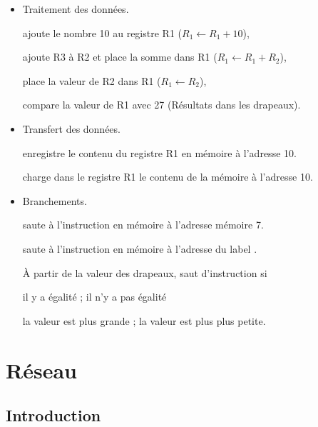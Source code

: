 \begin{itemize}
	\item Traitement des données.
	
	 ajoute le nombre 10 au registre R1 ($R_1 \leftarrow R_1+10$),
	
	 ajoute R3 à R2 et place la somme dans R1 ($R_1 \leftarrow R_1+R_2$),
	
	 place la valeur de R2 dans R1  ($R_1 \leftarrow R_2$),
	
	 compare la valeur de R1 avec 27 (Résultats dans les drapeaux).
	
	\item Transfert des données.
   	
	 enregistre le contenu du registre R1 en mémoire à l'adresse 10.
   	
	 charge dans le registre R1 le contenu de la mémoire à l'adresse 10.
	
	\item Branchements.
	
	 saute à l'instruction en mémoire à l'adresse mémoire 7.
	
	 saute à l'instruction en mémoire à l'adresse du label .
	
	À partir de la valeur des drapeaux, saut d'instruction si
	
	\quad {} il y a égalité ;  il n'y a pas égalité
	
	\quad {} la valeur est plus grande ;  la valeur est plus plus petite.
\end{itemize}


\chapter{Réseau}

\section{Introduction}



